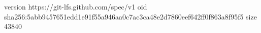 version https://git-lfs.github.com/spec/v1
oid sha256:5abb9457651edd1e91f55a946aa0c7ac3ca48e2d7860eef642ff0f863a8f95f5
size 43840
